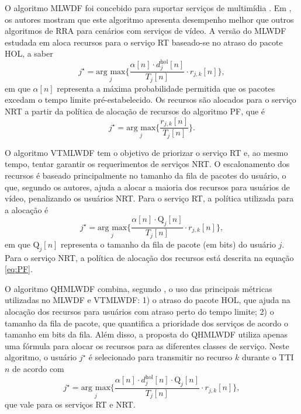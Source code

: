 O algoritmo MLWDF foi concebido para suportar serviços de multimídia \cite{Nasralla2013}. Em , os autores mostram que este algoritmo apresenta desempenho melhor que outros algoritmos de RRA para cenários com serviços de vídeo. A versão do MLWDF estudada em  aloca recursos para o serviço RT baseado-se no atraso do pacote HOL, a saber
%
\begin{equation}
j^{\star} = \underset{j}{\text{arg max}}\Big\{ \dfrac{\alpha[n] \cdot d_{j}^{\text{hol}}[n] } {T_{j}[n]} \cdot r_{j, k}[n] \Big \},
\end{equation}
%
em que $\alpha[n]$ representa a máxima probabilidade permitida que os pacotes excedam o tempo limite pré-estabelecido. Os recursos são alocados para o serviço NRT a partir da política de alocação de recursos do algoritmo PF, que é
%
\begin{equation}
\label{eq:PF}
j^{\star} = \underset{j}{\text{arg max}}\Big\{\frac{r_{j, k}[n]}{T_{j}\left[n\right]} \Big \}.
\end{equation}

O algoritmo VTMLWDF \cite{iturralde2011performance} tem o objetivo de priorizar o serviço RT e, ao mesmo tempo, tentar garantir os requerimentos de serviços NRT. O escalonamento dos recursos é baseado principalmente no tamanho da fila de pacotes do usuário, o que, segundo os autores, ajuda a alocar a maioria dos recursos para usuários de vídeo, penalizando os usuários NRT. Para o serviço RT, a política utilizada para a alocação é 
%
\begin{equation}
j^{\star} = \underset{j}{\text{arg max}}\Big\{ \dfrac{\alpha[n] \cdot \text{Q}_{j}[n]} {T_{j}[n]} \cdot r_{j, k}[n] \Big\},
\end{equation}
%
em que $\text{Q}_{j}[n]$ representa o tamanho da fila de pacote (em bits) do usuário $j$. Para o serviço NRT, a política de alocação dos recursos está descrita na equação \ref{eq:PF}. 

O algoritmo QHMLWDF combina, segundo , o uso das principais métricas utilizadas no MLWDF e VTMLWDF: 1) o atraso do pacote HOL, que ajuda na alocação dos recursos para usuários com atraso perto do tempo limite; 2) o tamanho da fila de pacote, que quantifica a prioridade dos serviços de acordo o tamanho em bits da fila. Além disso, a proposta do QHMLWDF utiliza apenas uma fórmula para alocar os recursos para as diferentes classes de serviço. Neste algoritmo, o usuário $j^{\star}$ é selecionado para transmitir no recurso $k$ durante o TTI $n$ de acordo com 
%
\begin{equation}
\label{Eq:QHMLWDF_RT_NRT}
j^{\star} = \underset{j}{\text{arg max}}\Big\{ \dfrac{\alpha[n] \cdot d_{j}^{\text{hol}}[n] \cdot \text{Q}_{j}[n]} {T_{j}[n]} \cdot r_{j, k}[n] \Big\},
\end{equation}
%
que vale para os serviços RT e NRT.

